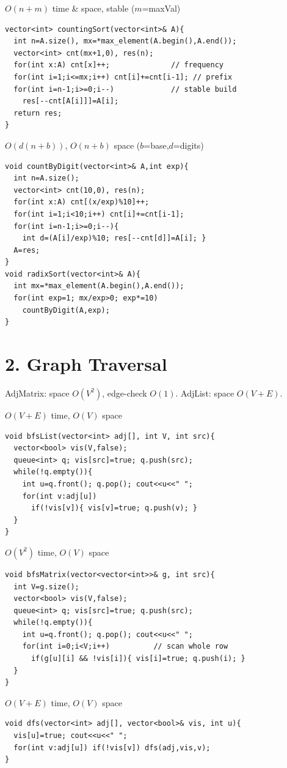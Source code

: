 \documentclass[8pt,landscape,a4paper]{extarticle}
\newcommand{\algo}[2]{\vspace{1pt}{\bfseries #1}\hfill{\footnotesize\color{cx}#2}\par\vspace{-1pt}}
\begin{document}
\begin{multicols}{3}
\algo{Counting Sort}{$O(n+m)$ time \& space, stable ($m$=maxVal)}
\begin{lstlisting}
vector<int> countingSort(vector<int>& A){
  int n=A.size(), mx=*max_element(A.begin(),A.end());
  vector<int> cnt(mx+1,0), res(n);
  for(int x:A) cnt[x]++;              // frequency
  for(int i=1;i<=mx;i++) cnt[i]+=cnt[i-1]; // prefix
  for(int i=n-1;i>=0;i--)             // stable build
    res[--cnt[A[i]]]=A[i];
  return res;
}
\end{lstlisting}

\algo{Radix Sort}{$O(d(n+b))$, $O(n+b)$ space ($b$=base,$d$=digits)}
\begin{lstlisting}
void countByDigit(vector<int>& A,int exp){
  int n=A.size();
  vector<int> cnt(10,0), res(n);
  for(int x:A) cnt[(x/exp)%10]++;
  for(int i=1;i<10;i++) cnt[i]+=cnt[i-1];
  for(int i=n-1;i>=0;i--){
    int d=(A[i]/exp)%10; res[--cnt[d]]=A[i]; }
  A=res;
}
void radixSort(vector<int>& A){
  int mx=*max_element(A.begin(),A.end());
  for(int exp=1; mx/exp>0; exp*=10)
    countByDigit(A,exp);
}
\end{lstlisting}

\section*{2. Graph Traversal}
{\footnotesize AdjMatrix: space $O(V^2)$, edge-check $O(1)$. AdjList: space $O(V{+}E)$.}

\algo{BFS --- Adjacency List}{$O(V+E)$ time, $O(V)$ space}
\begin{lstlisting}
void bfsList(vector<int> adj[], int V, int src){
  vector<bool> vis(V,false);
  queue<int> q; vis[src]=true; q.push(src);
  while(!q.empty()){
    int u=q.front(); q.pop(); cout<<u<<" ";
    for(int v:adj[u])
      if(!vis[v]){ vis[v]=true; q.push(v); }
  }
}
\end{lstlisting}

\algo{BFS --- Adjacency Matrix}{$O(V^2)$ time, $O(V)$ space}
\begin{lstlisting}
void bfsMatrix(vector<vector<int>>& g, int src){
  int V=g.size();
  vector<bool> vis(V,false);
  queue<int> q; vis[src]=true; q.push(src);
  while(!q.empty()){
    int u=q.front(); q.pop(); cout<<u<<" ";
    for(int i=0;i<V;i++)          // scan whole row
      if(g[u][i] && !vis[i]){ vis[i]=true; q.push(i); }
  }
}
\end{lstlisting}

\algo{DFS (Recursive)}{$O(V+E)$ time, $O(V)$ space}
\begin{lstlisting}
void dfs(vector<int> adj[], vector<bool>& vis, int u){
  vis[u]=true; cout<<u<<" ";
  for(int v:adj[u]) if(!vis[v]) dfs(adj,vis,v);
}
\end{lstlisting}


\end{multicols}
\end{document}
